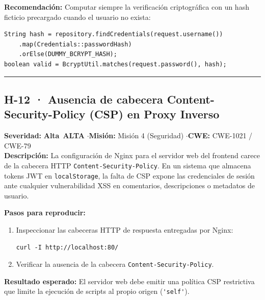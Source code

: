 \documentclass[10pt,a4paper]{article}
\newcommand{\code}[1]{\nolinkurl{#1}}
\newcommand{\badgeAlta}{\colorbox{orange!20}{\textcolor{orange!90!black}{\textbf{\footnotesize Alta}}}}
\begin{document}
\noindent\textbf{Recomendación:}
Computar siempre la verificación criptográfica con un hash ficticio precargado cuando el usuario no exista:
\begin{tcolorbox}[colback=codebg,colframe=gray!40,arc=1mm]\small
\begin{verbatim}
String hash = repository.findCredentials(request.username())
    .map(Credentials::passwordHash)
    .orElse(DUMMY_BCRYPT_HASH);
boolean valid = BcryptUtil.matches(request.password(), hash);
\end{verbatim}
\end{tcolorbox}

\vspace{0.8em}
\hrule
\vspace{0.8em}

\subsection{H-12 · Ausencia de cabecera Content-Security-Policy (CSP) en Proxy Inverso}
\noindent\textbf{Severidad:} \badgeAlta\ \textbf{ALTA} \quad$\cdot$\quad \textbf{Misión:} Misión 4 (Seguridad) \quad$\cdot$\quad \textbf{CWE:} CWE-1021 / CWE-79\\[0.3em]

\noindent\textbf{Descripción:}
La configuración de Nginx para el servidor web del frontend carece de la cabecera HTTP \code{Content-Security-Policy}. En un sistema que almacena tokens JWT en \code{localStorage}, la falta de CSP expone las credenciales de sesión ante cualquier vulnerabilidad XSS en comentarios, descripciones o metadatos de usuario.

\noindent\textbf{Pasos para reproducir:}
\begin{enumerate}[leftmargin=*]
    \item Inspeccionar las cabeceras HTTP de respuesta entregadas por Nginx:
    \begin{tcolorbox}[colback=codebg,colframe=gray!40,arc=1mm]\small
\begin{verbatim}
curl -I http://localhost:80/
\end{verbatim}
    \end{tcolorbox}
    \item Verificar la ausencia de la cabecera \code{Content-Security-Policy}.
\end{enumerate}

\noindent\textbf{Resultado esperado:}
El servidor web debe emitir una política CSP restrictiva que limite la ejecución de scripts al propio origen (\code{'self'}).
\end{document}
